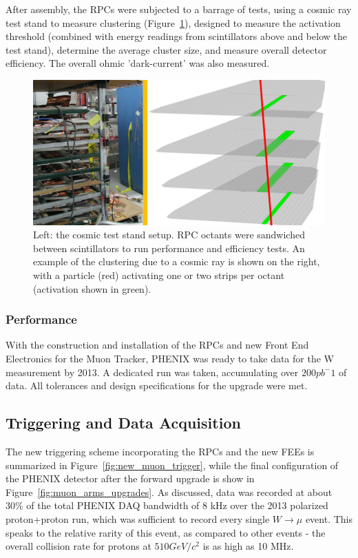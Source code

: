 
After assembly, the RPCs were subjected to a barrage of tests, using a cosmic
ray test stand to measure clustering (Figure~\ref{fig:rpc_cosmics_test_stand}),
designed to measure the activation threshold (combined with energy readings from
scintillators above and below the test stand), determine the average cluster
size, and measure overall detector efficiency. The overall ohmic 'dark-current'
was also measured.

\begin{figure}
  \centering
  \includegraphics[width=\linewidth]{./figures/rpc_cosmics_test_stand}
  \caption{
    Left: the cosmic test stand setup. RPC octants were sandwiched between
    scintillators to run performance and efficiency tests. An example of the
    clustering due to a cosmic ray is shown on the right, with a particle (red)
    activating one or two strips per octant (activation shown in green).
  }
  \label{fig:rpc_cosmics_test_stand}
\end{figure}

\subsubsection{Performance}

With the construction and installation of the RPCs and new Front End Electronics
for the Muon Tracker, PHENIX was ready to take data for the W measurement by
2013. A dedicated run was taken, accumulating over $200 pb^-1$ of data. All
tolerances and design specifications for the upgrade were met.

\subsection{Triggering and Data Acquisition}

The new triggering scheme incorporating the RPCs and the new FEEs is summarized
in Figure~\ref{fig:new_muon_trigger}, while the final configuration of the
PHENIX detector after the forward upgrade is show in
Figure~\ref{fig:muon_arms_upgrades}. As discussed, data was recorded at about
30\% of the total PHENIX DAQ bandwidth of 8 kHz over the 2013 polarized
proton+proton run, which was sufficient to record every single $W\rightarrow\mu$
event. This speaks to the relative rarity of this event, as compared to other
events - the overall collision rate for protons at $510 GeV/c^2$ is as high as
10 MHz.

